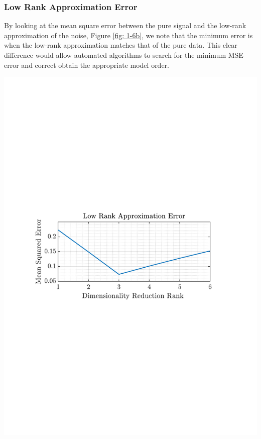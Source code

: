 \documentclass[12pt]{article}
\numberwithin{equation}{section}
\begin{document}
	 	
	 	\subsubsection{Low Rank Approximation Error}
		 	\begin{minipage}[b]{0.49\textwidth}
			By looking at the mean square error between the pure signal and the low-rank approximation of the noise, Figure \ref{fig: 1-6b}, we note that the minimum error is when the low-rank approximation matches that of the pure data. This clear difference would allow automated algorithms to search for the minimum MSE error and correct obtain the appropriate model order.
			\end{minipage}%
			\begin{minipage}{0.04\textwidth}
				\hspace*{0.04\textwidth}
			\end{minipage}%
			\begin{minipage}{0.49\textwidth}
				\centering
				\includegraphics[trim={2.2cm 11.2cm 3.15cm  11.2cm}, clip, width=\textwidth]{../MATLAB/figures/q1_6b_fig01.pdf} 
				\captionsetup{justification=centering}
				\label{fig: 1-6b}
			\end{minipage}%
	
\end{document}
